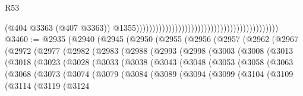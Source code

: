 \begin{lexlean}{R53}
\begin{coremodule}
                                                                                            (@404
                                                                                              @3363
                                                                                              (@407
                                                                                                @3363))
                                                                                            @1355))))))))))))))))))))))))))))))))))))))))))))
@3460 := @2935
    (@2940
      (@2945
        (@2950
          (@2955
            (@2956
              (@2957
                (@2962
                  (@2967
                    (@2972
                      (@2977
                        (@2982
                          (@2983
                            (@2988
                              (@2993
                                (@2998
                                  (@3003
                                    (@3008
                                      (@3013
                                        (@3018
                                          (@3023
                                            (@3028
                                              (@3033
                                                (@3038
                                                  (@3043
                                                    (@3048
                                                      (@3053
                                                        (@3058
                                                          (@3063
                                                            (@3068
                                                              (@3073
                                                                (@3074
                                                                  (@3079
                                                                    (@3084
                                                                      (@3089
                                                                        (@3094
                                                                          (@3099
                                                                            (@3104
                                                                              (@3109
                                                                                (@3114
                                                                                  (@3119
                                                                                    (@3124

\end{coremodule}
\end{lexlean}
